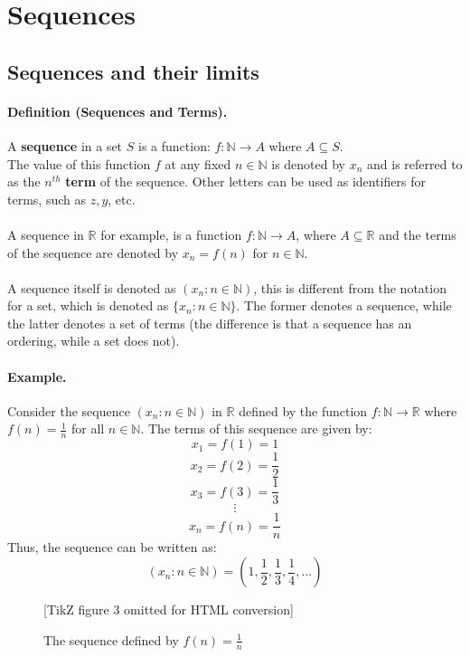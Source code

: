 \documentclass[openany]{book}
\numberwithin{equation}{section}
\begin{document}
\section{Sequences}
\subsection{Sequences and their limits}
\paragraph{Definition (Sequences and Terms).}

    A \textbf{sequence} in a set $S$ is a function: $f: \mathbb{N} \rightarrow A$ where $A \subseteq S$. \\ 
    The value of this function $f$ at any fixed $n \in \mathbb{N}$ is denoted by $x_n$ and is referred to as the  $n^{th}$ \textbf{term} of the sequence. Other letters can be used as identifiers for terms, such as $z, y$, etc. \\\\
    A sequence in $\mathbb{R}$ for example, is a function $f: \mathbb{N} \rightarrow A$, where $A \subseteq \mathbb{R}$ and the terms of the sequence are denoted by $x_n = f(n)$ for $n \in \mathbb{N}$. \\\\
    A sequence itself is denoted as $(x_n : n \in \mathbb{N})$, this is different from the notation for a set, which is denoted as $\{x_n : n \in \mathbb{N}\}$. The former denotes a sequence, while the latter denotes a set of terms (the difference is that a sequence has an ordering, while a set does not). 
\par
\paragraph{Example.}

    Consider the sequence $(x_n : n \in \mathbb{N})$ in $\mathbb{R}$ defined by the function $f: \mathbb{N} \rightarrow \mathbb{R}$ where $f(n) = \frac{1}{n}$ for all $n \in \mathbb{N}$. The terms of this sequence are given by:
    $$x_1 = f(1) = 1$$
    $$x_2 = f(2) = \frac{1}{2}$$
    $$x_3 = f(3) = \frac{1}{3}$$
    $$\vdots$$
    $$x_n = f(n) = \frac{1}{n}$$
    Thus, the sequence can be written as:
    $$(x_n : n \in \mathbb{N}) = \left(1, \frac{1}{2}, \frac{1}{3}, \frac{1}{4}, ...\right)$$
    \begin{figure}[H]
        \centering
        

[TikZ figure 3 omitted for HTML conversion]

        \caption{The sequence defined by $f(n) = \frac{1}{n}$}
    \end{figure}
\par
\end{document}
